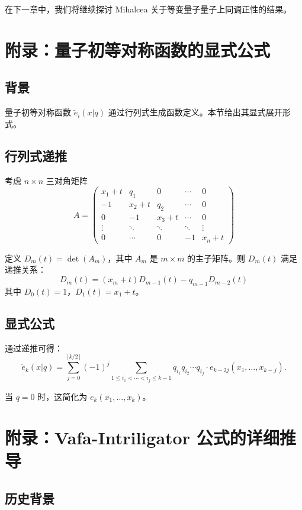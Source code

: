 在下一章中，我们将继续探讨 Mihalcea 关于等变量子量子上同调正性的结果。

\section{附录：量子初等对称函数的显式公式}
\label{sec:quantum-elementary-explicit}

\subsection*{背景}
量子初等对称函数 $\widetilde{e}_i(x|q)$ 通过行列式生成函数定义。本节给出其显式展开形式。

\subsection*{行列式递推}

考虑 $n \times n$ 三对角矩阵
$$A = \begin{pmatrix}
x_1 + t & q_1 & 0 & \cdots & 0 \\
-1 & x_2 + t & q_2 & \cdots & 0 \\
0 & -1 & x_3 + t & \cdots & 0 \\
\vdots & \ddots & \ddots & \ddots & \vdots \\
0 & \cdots & 0 & -1 & x_n + t
\end{pmatrix}$$

定义 $D_m(t) = \det(A_m)$，其中 $A_m$ 是 $m \times m$ 的主子矩阵。则 $D_m(t)$ 满足递推关系：
$$D_m(t) = (x_m + t) D_{m-1}(t) - q_{m-1} D_{m-2}(t)$$
其中 $D_0(t) = 1$，$D_1(t) = x_1 + t$。

\subsection*{显式公式}

通过递推可得：
$$\widetilde{e}_k(x|q) = \sum_{j=0}^{\lfloor k/2 \rfloor} (-1)^j \sum_{1 \leq i_1 < \cdots < i_j \leq k-1} q_{i_1} q_{i_2} \cdots q_{i_j} \cdot e_{k-2j}(x_1, \ldots, x_{k-j}).$$

当 $q=0$ 时，这简化为 $e_k(x_1, \ldots, x_k)$。

\section{附录：Vafa-Intriligator 公式的详细推导}
\label{sec:appendix-ch3-vafa-intriligator}

\subsection*{历史背景}

